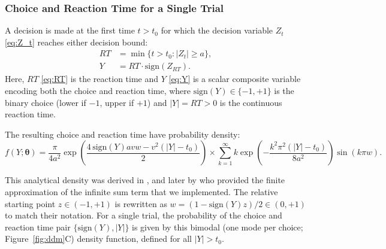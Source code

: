 \documentclass[00-main.tex]{subfiles}
\begin{document}
\subsubsection{Choice and Reaction Time for a Single Trial}
A decision is made at the first time $t>t_0$ for which the decision variable $Z_t$ \eqref{eq:Z_t} reaches either decision bound:
\begin{subequations}
\begin{align}
        RT &= \min \{t>t_0 : |Z_t| \ge a\},\label{eq:RT}\\
        Y &= RT \cdot \text{sign}(Z_{RT}).\label{eq:Y}
\end{align}
\end{subequations}
Here, $RT$ \eqref{eq:RT} is the reaction time and $Y$ \eqref{eq:Y} is a scalar composite variable encoding both the choice and reaction time, where $\text{sign}(Y) \in \{-1, +1\}$ is the binary choice (lower if $-1$, upper if $+1$) and $|Y| = RT > 0$ is the continuous reaction time.

The resulting choice and reaction time have probability density:
\begin{equation}\label{eq:f}
    f(Y ; \bm{\theta}) = \frac{\pi}{4a^2}\exp\left(\frac{4\,\text{sign}(Y)avw-v^2(|Y|-t_0)}{2}\right) \times\sum_{k=1}^\infty k\exp\left(-\frac{k^2\pi^2 (|Y|-t_0)}{8a^2}\right)\sin(k\pi w).
\end{equation}

This analytical density was derived in \citet[Chapter~14, Equation~6.15]{feller_introduction_1968}, and later by \citet[Equation~13]{navarro_fast_2009} who provided the finite approximation of the infinite sum term that we implemented. The relative starting point $z\in(-1, +1)$ is rewritten as $w = (1-\text{sign}(Y)z)/{2} \in (0, +1)$ to match their notation. For a single trial, the probability of the choice and reaction time pair $\{\text{sign}(Y), |Y|\}$ is given by this bimodal (one mode per choice; Figure~\ref{fig:ddm}C) density function, defined for all $|Y|>t_0$.
\end{document}
